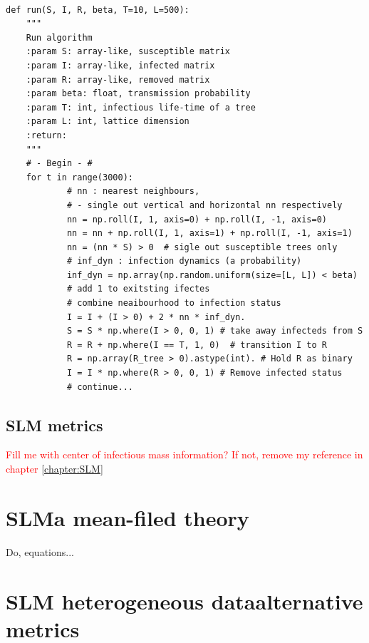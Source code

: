 \begin{lstlisting}[style=pythoncode,
    caption = An alorithm written in python to compute matrix equations and simulate disease spread. Code can be found in: \textcolor{red}{cite github repo?}.,
    label = py:rand]

def run(S, I, R, beta, T=10, L=500):
    """
    Run algorithm
    :param S: array-like, susceptible matrix
    :param I: array-like, infected matrix
    :param R: array-like, removed matrix
    :param beta: float, transmission probability
    :param T: int, infectious life-time of a tree
    :param L: int, lattice dimension
    :return:
    """
    # - Begin - #
    for t in range(3000):
            # nn : nearest neighbours, 
            # - single out vertical and horizontal nn respectively
            nn = np.roll(I, 1, axis=0) + np.roll(I, -1, axis=0)
            nn = nn + np.roll(I, 1, axis=1) + np.roll(I, -1, axis=1)
            nn = (nn * S) > 0  # sigle out susceptible trees only
            # inf_dyn : infection dynamics (a probability)
            inf_dyn = np.array(np.random.uniform(size=[L, L]) < beta)
            # add 1 to exitsting ifectes 
            # combine neaibourhood to infection status
            I = I + (I > 0) + 2 * nn * inf_dyn. 
            S = S * np.where(I > 0, 0, 1) # take away infecteds from S
            R = R + np.where(I == T, 1, 0)  # transition I to R
            R = np.array(R_tree > 0).astype(int). # Hold R as binary
            I = I * np.where(R > 0, 0, 1) # Remove infected status 
            # continue...
\end{lstlisting}

\section{SLM metrics}
\label{a:slm_metrics}

\textcolor{red}{Fill me with center of infectious mass information? If not, remove my reference in chapter \ref{chapter:SLM}}

\chapter{SLM\textemdash a mean-filed theory}

\label{a:slm-mean-field-theory}

Do, equations...
\blindtext

\chapter{SLM heterogeneous data\textemdash alternative metrics}
\label{a:slm_heterogeneous}

